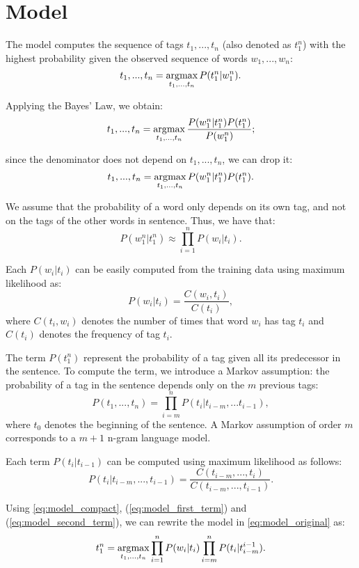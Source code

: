 \section{Model}
\label{sec:model}

The model computes the sequence of tags $t_1, ..., t_n$ (also denoted as $t_1^n$) with the highest probability given the observed sequence of words 
$w_1, ..., w_n$:
\begin{equation}
    t_1, ..., t_n = \operatorname*{arg\!\max}_{t_1, ..., t_n} P(t_1^n | w_1^n).
    \label{eq:model_original}
\end{equation}

Applying the Bayes' Law, we obtain:
\begin{equation*}
    t_1, ..., t_n = \operatorname*{arg\!\max}_{t_1, ..., t_n} \frac{P(w_1^n | t_1^n) P(t_1^n)}{P(w_1^n)};
\end{equation*}

since the denominator does not depend on $t_1, ..., t_n$, we can drop it:
\begin{equation}
    t_1, ..., t_n = \operatorname*{arg\!\max}_{t_1, ..., t_n} P(w_1^n | t_1^n) P(t_1^n).
    \label{eq:model_compact}
\end{equation}

We assume that the probability of a word only depends on its own tag, and not on the tags of the other words in sentence.
Thus, we have that:
\begin{equation}
    P(w_1^n | t_1^n) \approx \prod_{i=1}^n P(w_i | t_i).
    \label{eq:model_first_term}
\end{equation}

Each $P(w_i | t_i)$ can be easily computed from the training data using maximum likelihood as:
\begin{equation*}
    P(w_i | t_i) = \frac{C(w_i, t_i)}{C(t_i)},
\end{equation*}
where $C(t_i, w_i)$ denotes the number of times that word $w_i$ has tag $t_i$ 
and $C(t_i)$ denotes the frequency of tag $t_i$.

The term $P(t_1^n)$ represent the probability of a tag given all its predecessor in the sentence.
To compute the term, we introduce a Markov assumption: the probability of a tag in the sentence
depends only on the $m$ previous tags:
\begin{equation}
    P(t_1, ..., t_n) = \prod_{i=m}^n P(t_i | t_{i-m}, ... t_{i-1}),
    \label{eq:model_second_term}
\end{equation}
where $t_0$ denotes the beginning of the sentence.
A Markov assumption of order $m$ corresponds to a $m+1$ n-gram language model.

Each term $P(t_i | t_{i-1})$ can be computed using maximum likelihood as follows:
\begin{equation*}
    P(t_i | t_{i-m}, ..., t_{i-1}) = \frac{C(t_{i-m}, ..., t_{i})}{C(t_{i-m}, ..., t_{i-1})}.
\end{equation*}

Using \cref{eq:model_compact}, (\ref{eq:model_first_term}) and (\ref{eq:model_second_term}), we can rewrite the model in \cref{eq:model_original} as:
\begin{equation*}
    t_1^n = \operatorname*{arg\!\max}_{t_1, ..., t_n} \prod_{i=1}^n P(w_i | t_i) \prod_{i=m}^n P(t_i | t_{i-m}^{i-1}).
\end{equation*}
